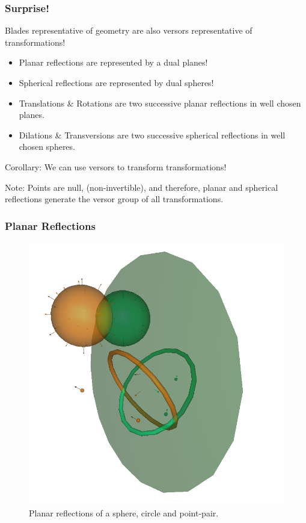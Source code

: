\documentclass{beamer}
\begin{document}
\begin{frame}
\frametitle{Surprise!}
\pause
\alert{Blades} representative of geometry are also \alert{versors} representative of transformations!\pause
\begin{itemize}
\item \alert{Planar reflections} are represented by a dual planes!\pause
\item \alert{Spherical reflections} are represented by dual spheres!\pause
\item \alert{Translations} \& \alert{Rotations} are two successive planar reflections in well chosen planes.\pause
\item \alert{Dilations} \& \alert{Transversions} are two successive spherical reflections in well chosen spheres.\pause
\end{itemize}
\alert{Corollary}: We can use versors to transform transformations!\pause

\alert{Note}: Points are null, (non-invertible), and therefore, planar and spherical reflections \alert{generate} the versor group of all transformations.
\end{frame}

\begin{frame}
\frametitle{Planar Reflections}
\begin{figure}
\centering
\includegraphics[scale=0.3]{PlanarReflectionsPerspectiveOne}
\caption{Planar reflections of a sphere, circle and point-pair.}
\end{figure}
\end{frame}
\end{document}
